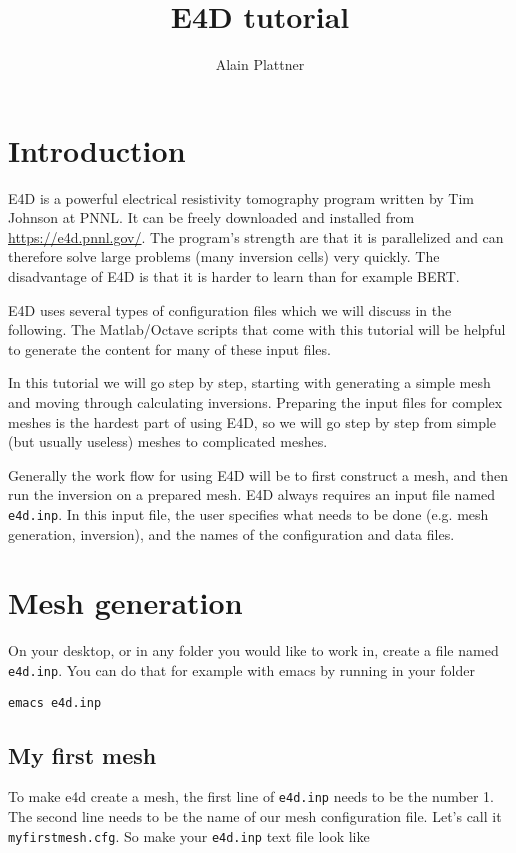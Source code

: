 \documentclass[11pt]{article}
\title{E4D tutorial}
\author{Alain Plattner}
\begin{document}
\maketitle

\section{Introduction}
E4D is a powerful electrical resistivity tomography program written by
Tim Johnson at PNNL. It can be freely downloaded and installed from
\url{https://e4d.pnnl.gov/}. The program's strength are that it is
parallelized and can therefore solve large problems (many inversion
cells) very quickly. The disadvantage of E4D is that it is harder to
learn than for example BERT.

E4D uses several types of configuration files which we will discuss in the
following. The Matlab/Octave scripts that come with this tutorial will
be helpful to generate the content for many of these input files.

In this tutorial we will go step by step, starting with generating a
simple mesh and moving through calculating inversions. Preparing the
input files for complex meshes is the hardest part of using E4D, so we
will go step by step from simple (but usually useless) meshes to
complicated meshes.

Generally the work flow for using E4D will be to first construct a
mesh, and then run the inversion on a prepared mesh. E4D always
requires an input file named \verb+e4d.inp+. In this input file, the
user specifies what needs to be done (e.g. mesh generation,
inversion), and the names of the configuration and data files.


\section{Mesh generation}
On your desktop, or in any folder you would like to work in, create a
file named \verb+e4d.inp+. You can do that for example with emacs by
running in your folder

\qquad \verb+emacs e4d.inp+ 


\subsection{My first mesh}\label{simplemesh}

To make e4d create a mesh, the first line of \verb+e4d.inp+ needs to
be the number 1. The second line needs to be the name of our mesh
configuration file. Let's call it \verb+myfirstmesh.cfg+. So make your
\verb+e4d.inp+ text file look like
\end{document}
